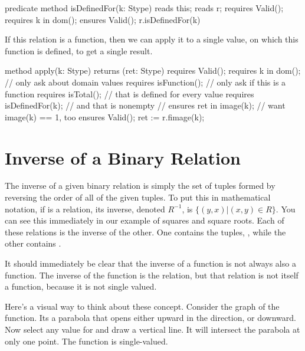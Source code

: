 \documentclass[letterpaper,10pt,english]{sphinxmanual}
\begin{document}
\begin{sphinxVerbatim}[commandchars=\\\{\}]
predicate method isDefinedFor(k: Stype)
    reads this;
    reads r;
    requires Valid();
    requires k in dom();
    ensures Valid();
\PYGZob{}
    r.isDefinedFor(k)
\PYGZcb{}

If this relation is a function, then we can
\PYGZdq{}apply\PYGZdq{} it to a single value, on which this
function is defined, to get a single result.
\end{sphinxVerbatim}

\begin{sphinxVerbatim}[commandchars=\\\{\}]
method apply(k: Stype) returns (ret: Stype)
    requires Valid();
    requires k in dom();   // only ask about domain values
    requires isFunction(); // only ask if this is a function
    requires isTotal();   // that is defined for every value
    requires isDefinedFor(k);  // and that is non\PYGZhy{}empty
    //  ensures ret in image(k);  // want \textbar{}image(k)\textbar{} == 1, too
    ensures Valid();
\PYGZob{}
    ret := r.fimage(k);
\PYGZcb{}
\end{sphinxVerbatim}


\section{Inverse of a Binary Relation}
\label{\detokenize{08-relations:inverse-of-a-binary-relation}}
The inverse of a given binary relation is simply the set of tuples
formed by reversing the order of all of the given tuples. To put this
in mathematical notation, if  is a relation, its inverse, denoted
\(R^{-1}\), is \(\{ (y, x) | (x, y) \in R \}\). You can see this
immediately in our example of squares and square roots. Each of these
relations is the inverse of the other. One contains the tuples, , while the other contains .

It should immediately be clear that the inverse of a function is not
always also a function. The inverse of the  function is the
 relation, but that relation is not itself a function,
because it is not single valued.

Here’s a visual way to think about these concept. Consider the graph
of the  function. Its a parabola that opens either upward in
the  direction, or downward. Now select any value for  and draw
a vertical line. It will intersect the parabola at only one point.
The function is single-valued.
\end{document}
